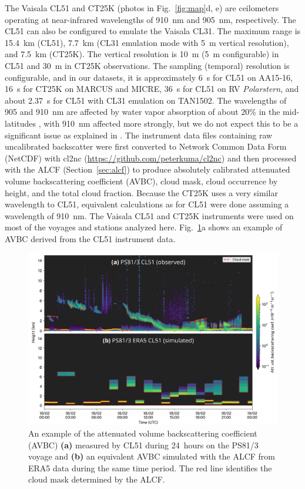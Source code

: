 \documentclass[draft]{agujournal2019}
\begin{document}
The Vaisala CL51 and CT25K (photos in Fig.~\ref{fig:map}d, e) are ceilometers operating at near-infrared wavelengths of 910~nm and 905~nm, respectively. The CL51 can also be configured to emulate the Vaisala CL31. The maximum range is 15.4~km (CL51), 7.7~km (CL31 emulation mode with 5~m vertical resolution), and 7.5~km (CT25K). The vertical resolution is 10~m (5~m configurable) in CL51 and 30~m in CT25K observations. The sampling (temporal) resolution is configurable, and in our datasets, it is approximately 6~s for CL51 on AA15‐16, 16~s for CT25K on MARCUS and MICRE, 36~s for CL51 on RV \emph{Polarstern}, and about 2.37~s for CL51 with CL31 emulation on TAN1502. The wavelengths of 905 and 910~nm are affected by water vapor absorption of about 20\% in the mid-latitudes \cite{wiegner2015,wiegner2019}, with 910~nm affected more strongly, but we do not expect this to be a significant issue as explained in . The instrument data files containing raw uncalibrated backscatter were first converted to Network Common Data Form (NetCDF) with cl2nc (\url{https://github.com/peterkuma/cl2nc}) and then processed with the ALCF (Section~\ref{sec:alcf}) to produce absolutely calibrated attenuated volume backscattering coefficient (AVBC), cloud mask, cloud occurrence by height, and the total cloud fraction. Because the CT25K uses a very similar wavelength to CL51, equivalent calculations as for CL51 were done assuming a wavelength of 910~nm. The Vaisala CL51 and CT25K instruments were used on most of the voyages and stations analyzed here. Fig.~\ref{fig:example}a shows an example of AVBC derived from the CL51 instrument data.

\begin{figure}[b!]
\centering
\includegraphics[width=\textwidth]{img/example.png}
\caption{
An example of the attenuated volume backscattering coefficient (AVBC) \textbf{(a)} measured by CL51 during 24~hours on the PS81/3 voyage and \textbf{(b)} an equivalent AVBC simulated with the ALCF from ERA5 data during the same time period. The red line identifies the cloud mask determined by the ALCF.
}
\label{fig:example}
\end{figure}
\end{document}
